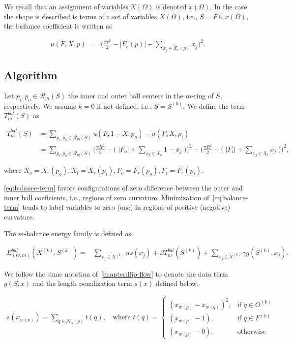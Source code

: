 We recall that an assignment of variables $X(\Omega)$ is denoted $x(\Omega)$. In the case the shape is described is terms of a set of variables $X(\Omega)$, i.e., $S=F \cup x(\Omega)$,  the ballance coefficient is written as

\begin{align*}
	u(F,X,p) &=  \Big( \frac{\pi r^2}{2} - |F_r(p)| - \sum_{x_j \in X_r(p)}{x_j} \Big)^2.
\end{align*}

\subsection{Algorithm}

Let $p_i, p_o \in \mathcal{R}_m(S)$ the inner and outer ball centers in the $m$-ring of $S$, respectively. We assume $k=0$ if not defined, i.e., $S=S^{(0)}$. We define the term $T_{m}^{bal}(S)$ as

\begin{align}
	T_{m}^{bal}(S) &= \sum_{p_i,p_o \in \mathcal{R}_m(S)}{u(F,1-X,p_o) - u(F,X,p_i)} \nonumber \\
	&=  \sum_{p_i,p_o \in \mathcal{R}_m(S)}{\Bigg( \frac{\pi R^2}{2} - \Big(\; |F_o| + \sum_{ x_j \in X_o}{1-x_j} \; \Big) \Bigg)^2 -\Bigg(\frac{\pi R^2}{2} - \Big(\; |F_i| + \sum_{x_j \in X_i}{x_j}\;\Big)\Bigg)^2},
	\label{eq:balance-term}
\end{align}

where $X_o=X_r(p_o), X_i=X_r(p_i), F_o=F_r(p_o), F_i=F_r(p_i)$.


\cref{eq:balance-term} favors configurations of zero difference between the outer and inner ball coeficients, i.e., regions of zero curvature. Minimization of~\cref{eq:balance-term} tends to label variables to zero (one) in regions of positive (negative) curvature.

The $m$-balance energy family is defined as

\begin{align}
  E_{(\Theta,m)}^{bal}(X^{(k)},S^{(k)}) =& \sum_{x_j \in X^{(k)}}{\alpha s(x_j)} + \beta T_{m}^{bal}(S^{(k)}) + \sum_{x_j \in X^{(k)}}{\gamma g(S^{(k)},x_j)}.
  \label{eq:single-step-energy-family}
\end{align}

We follow the same notation of~\cref{chapter:flip-flow} to denote the data term $g(S,x)$ and the length penalization term $s(x)$ defined below. 

\begin{align}
  s(x_{w(p)})=\sum_{q \in \mathcal{N}_4(p)}{ t(q) }, \quad \text{where } t(q) = \left\{\begin{array}{ll}
  (x_{w(p)}-x_{w(q)})^2, & \text{if } q \in O^{(k)}\\
  (x_{w(p)}-1), & \text{if } q \in F^{(k)}\\
  (x_{w(p)}-0), & \text{otherwise }
  \end{array}\right.
  \label{eq:single-step-length-penalization}
\end{align}

